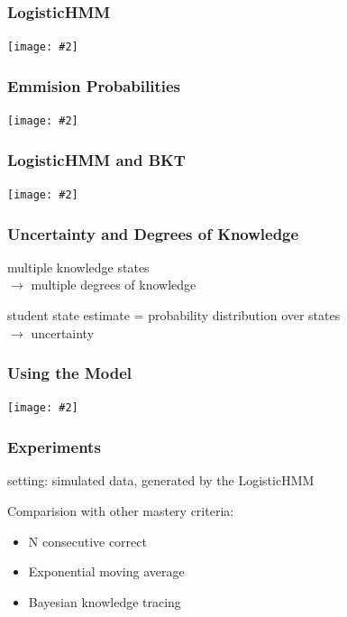 \documentclass[bigger]{beamer}
\newcommand{\img}[2]{
  \begin{center}
    \texttt{[image: \#2]}
  \end{center}
}
\begin{document}
\begin{frame}
  \frametitle{LogisticHMM}

  \img{.8}{logistichmm-intuition}
\end{frame}

\begin{frame}
  \frametitle{Emmision Probabilities}

  \img{.7}{hmm-model-examples1}
\end{frame}

\begin{frame}
  \frametitle{LogisticHMM and BKT}

  \img{.7}{hmm-model-examples2}
\end{frame}

\begin{frame}
  \frametitle{Uncertainty and Degrees of Knowledge}

  multiple knowledge states\\
  $\rightarrow$ multiple degrees of knowledge

  \bigskip
  \bigskip
  student state estimate = probability distribution over states\\
  $\rightarrow$ uncertainty
\end{frame}

\begin{frame}
  \frametitle{Using the Model}

  \img{}{hmm-model-demo1}
\end{frame}

\begin{frame}
  \frametitle{Experiments}

  setting: simulated data, generated by the LogisticHMM

  \bigskip

  Comparision with other mastery criteria:
  \begin{itemize}
  \item N consecutive correct
  \item Exponential moving average
  \item Bayesian knowledge tracing
  \end{itemize}
\end{frame}
\end{document}
